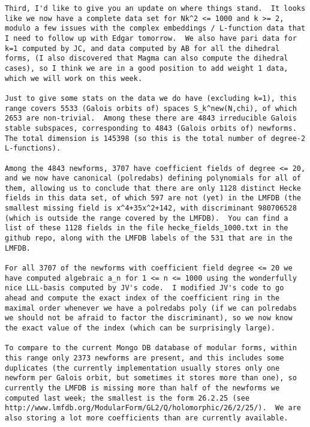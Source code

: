 \documentclass[11pt]{amsart}
\numberwithin{equation}{subsection}
\theoremstyle{definition}
\begin{document}
\begin{verbatim}
Third, I'd like to give you an update on where things stand.  It looks like we now have a complete data set for Nk^2 <= 1000 and k >= 2, modulo a few issues with the complex embeddings / L-function data that I need to follow up with Edgar tomorrow.  We also have pari data for k=1 computed by JC, and data computed by AB for all the dihedral forms, (I also discovered that Magma can also compute the dihedral cases), so I think we are in a good position to add weight 1 data, which we will work on this week.

Just to give some stats on the data we do have (excluding k=1), this range covers 5533 (Galois orbits of) spaces S_k^new(N,chi), of which 2653 are non-trivial.  Among these there are 4843 irreducible Galois stable subspaces, corresponding to 4843 (Galois orbits of) newforms.  The total dimension is 145398 (so this is the total number of degree-2 L-functions).

Among the 4843 newforms, 3707 have coefficient fields of degree <= 20, and we now have canonical (polredabs) defining polynomials for all of them, allowing us to conclude that there are only 1128 distinct Hecke fields in this data set, of which 597 are not (yet) in the LMFDB (the smallest missing field is x^4+35x^2+142, with discriminant 980706528 (which is outside the range covered by the LMFDB).  You can find a list of these 1128 fields in the file hecke_fields_1000.txt in the github repo, along with the LMFDB labels of the 531 that are in the LMFDB.

For all 3707 of the newforms with coefficient field degree <= 20 we have computed algebraic a_n for 1 <= n <= 1000 using the wonderfully nice LLL-basis computed by JV's code.  I modified JV's code to go ahead and compute the exact index of the coefficient ring in the maximal order whenever we have a polredabs poly (if we can polredabs we should not be afraid to factor the discriminant), so we now know the exact value of the index (which can be surprisingly large).

To compare to the current Mongo DB database of modular forms, within this range only 2373 newforms are present, and this includes some duplicates (the currently implementation usually stores only one newform per Galois orbit, but sometimes it stores more than one), so currently the LMFDB is missing more than half of the newforms we computed last week; the smallest is the form 26.2.25 (see http://www.lmfdb.org/ModularForm/GL2/Q/holomorphic/26/2/25/).  We are also storing a lot more coefficients than are currently available.


\end{verbatim}
\end{document}
